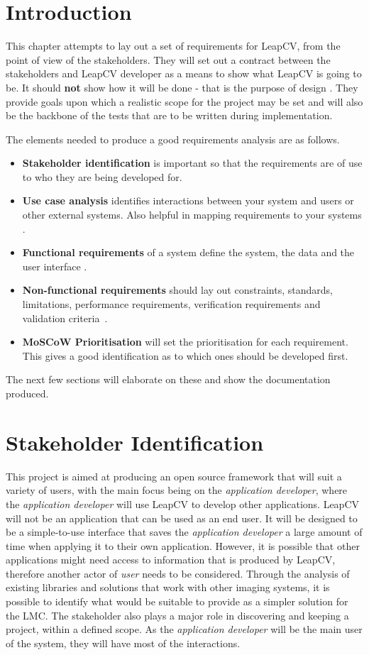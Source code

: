 \documentclass[11pt,oneside]{report}
\begin{document}
	\section{Introduction}
	This chapter attempts to lay out a set of requirements for LeapCV, from the point of view of the stakeholders.
	They will set out a contract between the stakeholders and LeapCV developer as a means to show what LeapCV is going to be. It should \textbf{not} show how it will be done - that is the purpose of design \cite{book:dawson}.
	They provide goals upon which a realistic scope for the project may be set and will also be the backbone of the tests that are to be written during implementation.
	
	The elements needed to produce a good requirements analysis are as follows.
	\begin{itemize}
		\item \textbf{Stakeholder identification} is important so that the requirements are of use to who they are being developed for.
		\item \textbf{Use case analysis} identifies interactions between your system and users or other external systems. Also helpful in mapping requirements to your systems \cite{book:uml}.
		\item \textbf{Functional requirements} of a system define the system, the data and the user interface \cite{book:dawson}.
		\item \textbf{Non-functional requirements} should lay out constraints, standards, limitations, performance requirements, verification requirements and validation criteria~\cite{book:dawson}.
		\item \textbf{MoSCoW Prioritisation} will set the prioritisation for each requirement. This gives a good identification as to which ones should be developed first.
	\end{itemize}
	The next few sections will elaborate on these and show the documentation produced. 
		
		\section{Stakeholder Identification}
			This project is aimed at producing an open source framework that will suit a variety of users, with the main focus being on the \textit{application developer}, where the \textit{application developer} will use LeapCV to develop other applications.
			LeapCV will not be an application that can be used as an end user.
			It will be designed to be a simple-to-use interface that saves the \textit{application developer} a large amount of time when applying it to their own application.
			However, it is possible that other applications might need access to information that is produced by LeapCV, therefore another actor of \textit{user} needs to be considered.
			Through the analysis of existing libraries and solutions that work with other imaging systems, it is possible to identify what would be suitable to provide as a simpler solution for the LMC.
			The stakeholder also plays a major role in discovering and keeping a project, within a defined scope.
			As the \textit{application developer} will be the main user of the system, they will	have most of the interactions.
			
\end{document}
